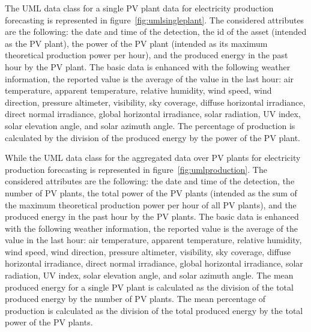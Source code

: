 The UML data class for a single PV plant data for electricity production forecasting is represented in figure~\ref{fig:umlsingleplant}.
The considered attributes are the following: the date and time of the detection, the id of the asset (intended as the PV plant), the power of the PV plant (intended as its maximum theoretical production power per hour), and the produced energy in the past hour by the PV plant.
The basic data is enhanced with the following weather information, the reported value is the average of the value in the last hour: air temperature, apparent temperature, relative humidity, wind speed, wind direction, pressure altimeter, visibility, sky coverage, diffuse horizontal irradiance, direct normal irradiance, global horizontal irradiance, solar radiation, UV index, solar elevation angle, and solar azimuth angle.
The percentage of production is calculated by the division of the produced energy by the power of the PV plant.

While the UML data class for the aggregated data over PV plants for electricity production forecasting is represented in figure~\ref{fig:umlproduction}.
The considered attributes are the following: the date and time of the detection, the number of PV plants, the total power of the PV plants (intended as the sum of the maximum theoretical production power per hour of all PV plants), and the produced energy in the past hour by the PV plants.
The basic data is enhanced with the following weather information, the reported value is the average of the value in the last hour: air temperature, apparent temperature, relative humidity, wind speed, wind direction, pressure altimeter, visibility, sky coverage, diffuse horizontal irradiance, direct normal irradiance, global horizontal irradiance, solar radiation, UV index, solar elevation angle, and solar azimuth angle.
The mean produced energy for a single PV plant is calculated as the division of the total produced energy by the number of PV plants.
The mean percentage of production is calculated as the division of the total produced energy by the total power of the PV plants.


